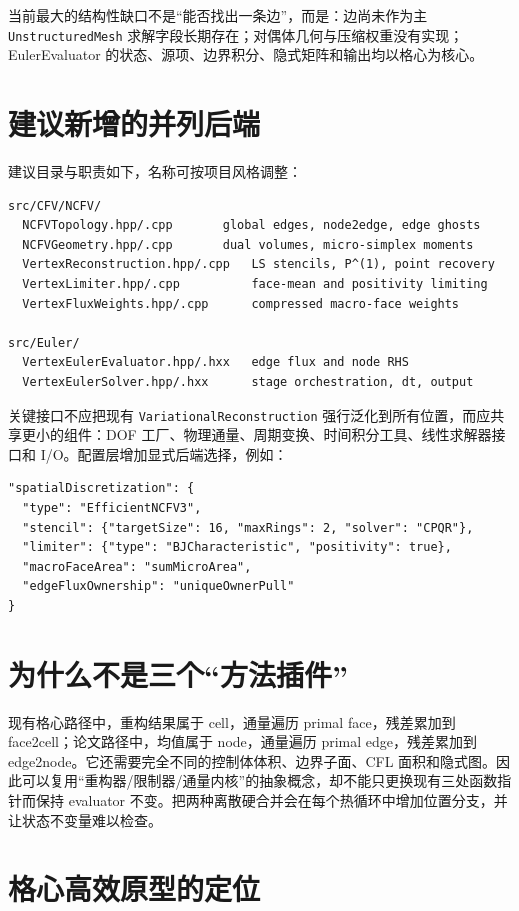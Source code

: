 \documentclass[UTF8,a4paper,11pt,openany]{ctexrep}
\numberwithin{equation}{chapter}
\newcommand{\code}[1]{\texttt{#1}}
\begin{document}
当前最大的结构性缺口不是“能否找出一条边”，而是：边尚未作为主 \code{UnstructuredMesh} 求解字段长期存在；对偶体几何与压缩权重没有实现；EulerEvaluator 的状态、源项、边界积分、隐式矩阵和输出均以格心为核心。

\section{建议新增的并列后端}

建议目录与职责如下，名称可按项目风格调整：

\begin{lstlisting}[style=dnds]
src/CFV/NCFV/
  NCFVTopology.hpp/.cpp       global edges, node2edge, edge ghosts
  NCFVGeometry.hpp/.cpp       dual volumes, micro-simplex moments
  VertexReconstruction.hpp/.cpp   LS stencils, P^(1), point recovery
  VertexLimiter.hpp/.cpp          face-mean and positivity limiting
  VertexFluxWeights.hpp/.cpp      compressed macro-face weights

src/Euler/
  VertexEulerEvaluator.hpp/.hxx   edge flux and node RHS
  VertexEulerSolver.hpp/.hxx      stage orchestration, dt, output
\end{lstlisting}

关键接口不应把现有 \code{VariationalReconstruction} 强行泛化到所有位置，而应共享更小的组件：DOF 工厂、物理通量、周期变换、时间积分工具、线性求解器接口和 I/O。配置层增加显式后端选择，例如：

\begin{lstlisting}[style=dnds]
"spatialDiscretization": {
  "type": "EfficientNCFV3",
  "stencil": {"targetSize": 16, "maxRings": 2, "solver": "CPQR"},
  "limiter": {"type": "BJCharacteristic", "positivity": true},
  "macroFaceArea": "sumMicroArea",
  "edgeFluxOwnership": "uniqueOwnerPull"
}
\end{lstlisting}

\section{为什么不是三个“方法插件”}

现有格心路径中，重构结果属于 cell，通量遍历 primal face，残差累加到 face2cell；论文路径中，均值属于 node，通量遍历 primal edge，残差累加到 edge2node。它还需要完全不同的控制体体积、边界子面、CFL 面积和隐式图。因此可以复用“重构器/限制器/通量内核”的抽象概念，却不能只更换现有三处函数指针而保持 evaluator 不变。把两种离散硬合并会在每个热循环中增加位置分支，并让状态不变量难以检查。

\section{格心高效原型的定位}
\end{document}
